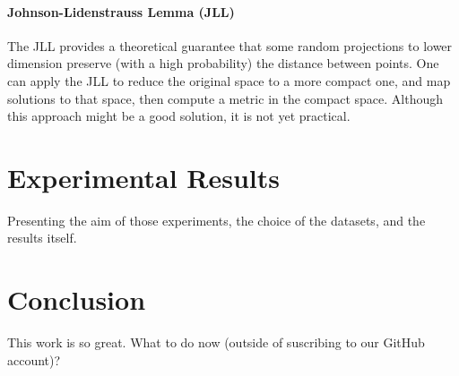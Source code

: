 \documentclass[letterpaper]{article} %
\begin{document}
\paragraph{Johnson-Lidenstrauss Lemma (JLL)}
The JLL provides a theoretical guarantee that some random projections to lower dimension preserve (with a high probability) the distance between points. One can apply the JLL to reduce the original space to a more compact one, and map solutions to that space, then compute a metric in the compact space.
Although this approach might be a good solution, it is not yet practical.

\section{Experimental Results}\label{sec:xp}
Presenting the aim of those experiments, the choice of the datasets, and the results itself.

\section{Conclusion}\label{sec:conclusion}
This work is so great. What to do now (outside of suscribing to our GitHub account)?

%


\end{document}
